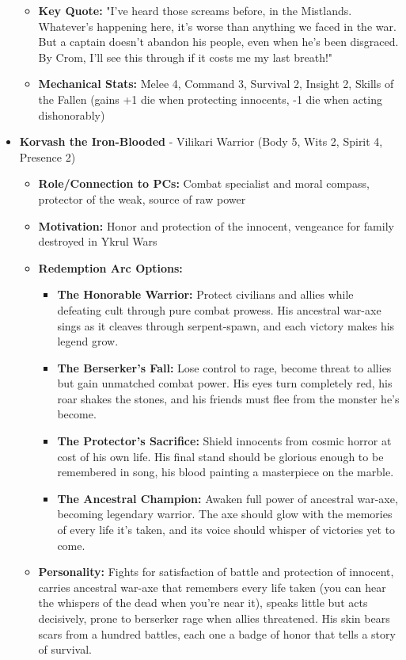 \documentclass[11pt]{article}
\begin{document}
\begin{itemize}
\begin{itemize}
  \item \textbf{Key Quote:} "I've heard those screams before, in the Mistlands. Whatever's happening here, it's worse than anything we faced in the war. But a captain doesn't abandon his people, even when he's been disgraced. By Crom, I'll see this through if it costs me my last breath!"
  \item \textbf{Mechanical Stats:} Melee 4, Command 3, Survival 2, Insight 2, Skills of the Fallen (gains +1 die when protecting innocents, -1 die when acting dishonorably)
  \end{itemize}
\item \textbf{Korvash the Iron-Blooded} - Vilikari Warrior (Body 5, Wits 2, Spirit 4, Presence 2)
  \begin{itemize}
  \item \textbf{Role/Connection to PCs:} Combat specialist and moral compass, protector of the weak, source of raw power
  \item \textbf{Motivation:} Honor and protection of the innocent, vengeance for family destroyed in Ykrul Wars
  \item \textbf{Redemption Arc Options:}
    \begin{itemize}
    \item \textbf{The Honorable Warrior:} Protect civilians and allies while defeating cult through pure combat prowess. His ancestral war-axe sings as it cleaves through serpent-spawn, and each victory makes his legend grow.
    \item \textbf{The Berserker's Fall:} Lose control to rage, become threat to allies but gain unmatched combat power. His eyes turn completely red, his roar shakes the stones, and his friends must flee from the monster he's become.
    \item \textbf{The Protector's Sacrifice:} Shield innocents from cosmic horror at cost of his own life. His final stand should be glorious enough to be remembered in song, his blood painting a masterpiece on the marble.
    \item \textbf{The Ancestral Champion:} Awaken full power of ancestral war-axe, becoming legendary warrior. The axe should glow with the memories of every life it's taken, and its voice should whisper of victories yet to come.
    \end{itemize}
  \item \textbf{Personality:} Fights for satisfaction of battle and protection of innocent, carries ancestral war-axe that remembers every life taken (you can hear the whispers of the dead when you're near it), speaks little but acts decisively, prone to berserker rage when allies threatened. His skin bears scars from a hundred battles, each one a badge of honor that tells a story of survival.

\end{itemize}
\end{itemize}
\end{document}
